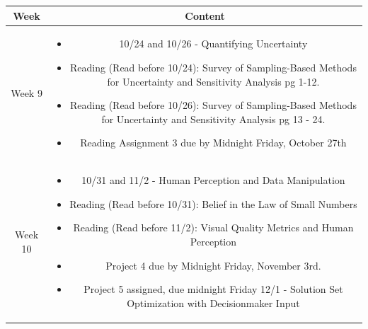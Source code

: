 \documentclass[11pt]{article}
\begin{document}
\begin{table}[h!]
\small %
\begin{tabular}{ | c | c | }
\hline
\textbf{Week} & \textbf{Content} \\
\hline

Week 9 & \begin{minipage}{.85\textwidth}
\begin{itemize} \itemsep-0.4em
	\vspace{1mm}
	\item 10/24 and 10/26 - Quantifying Uncertainty
	
	\item Reading (Read before 10/24): Survey of Sampling-Based Methods for Uncertainty and Sensitivity Analysis pg 1-12.
	\item Reading (Read before 10/26): Survey of Sampling-Based Methods for Uncertainty and Sensitivity Analysis pg 13 - 24.
	
	\item Reading Assignment 3 due by Midnight Friday, October 27th
	
	\vspace{1mm}
\end{itemize}
\end{minipage} \\
\hline

Week 10 & \begin{minipage}{.85\textwidth}
\begin{itemize} \itemsep-0.4em
	\vspace{1mm}
	\item 10/31 and 11/2 - Human Perception and Data Manipulation
	
	\item Reading (Read before 10/31): Belief in the Law of Small Numbers
	\item Reading (Read before 11/2): Visual Quality Metrics and Human Perception
	
	
	\item Project 4 due by Midnight Friday, November 3rd.
	\item Project 5 assigned, due midnight Friday 12/1 - Solution Set Optimization with Decisionmaker Input
	
	\vspace{1mm}
\end{itemize}
\end{minipage} \\
\hline


\end{tabular}
\end{table}
\end{document}
